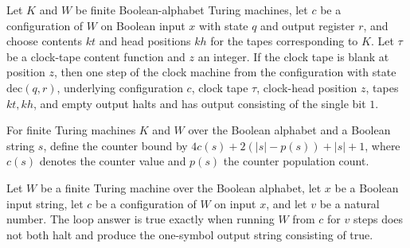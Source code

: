 \begin{lemma}
\label{Complexity.TimeHierarchy.underflow_step}
\leanok
{}
Let $K$ and $W$ be finite Boolean-alphabet Turing machines, let $c$ be a configuration
of $W$ on Boolean input $x$ with state $q$ and output register $r$, and choose contents
$kt$ and head positions $kh$ for the tapes corresponding to $K$. Let $\tau$ be a
clock-tape content function and $z$ an integer. If the clock tape is blank at position
$z$, then one step of the clock machine from the configuration with state
$\mathrm{dec}(q,r)$, underlying configuration $c$, clock tape $\tau$, clock-head
position $z$, tapes $kt,kh$, and empty output halts and has output consisting of the
single bit $1$.
\end{lemma}

\begin{definition}
\label{Complexity.TimeHierarchy.ctrBound}
\leanok
{}
For finite Turing machines $K$ and $W$ over the Boolean alphabet and a Boolean string
$s$, define the counter bound by $4c(s)+2(|s|-p(s))+|s|+1$, where $c(s)$ denotes the
counter value and $p(s)$ the counter population count.
\end{definition}

\begin{definition}
\label{Complexity.TimeHierarchy.loopAnswer}
\leanok
{}
Let $W$ be a finite Turing machine over the Boolean alphabet, let $x$ be a Boolean input
string, let $c$ be a configuration of $W$ on input $x$, and let $v$ be a natural number.
The loop answer is true exactly when running $W$ from $c$ for $v$ steps does not both
halt and produce the one-symbol output string consisting of true.
\end{definition}

